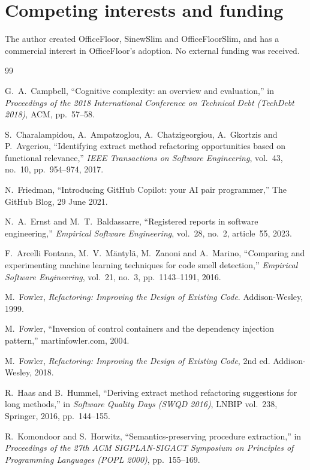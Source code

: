 \documentclass[11pt,a4paper]{article}
\begin{document}
\section*{Competing interests and funding}

The author created OfficeFloor, SinewSlim and OfficeFloorSlim, and has a
commercial interest in OfficeFloor's adoption. No external funding was
received.

\begin{thebibliography}{99}
\small

 G.~A.~Campbell,
  ``Cognitive complexity: an overview and evaluation,'' in \emph{Proceedings
  of the 2018 International Conference on Technical Debt (TechDebt 2018)},
  ACM, pp.~57--58.

 S.~Charalampidou, A.~Ampatzoglou,
  A.~Chatzigeorgiou, A.~Gkortzis and P.~Avgeriou,
  ``Identifying extract method refactoring opportunities based on functional
  relevance,'' \emph{IEEE Transactions on Software Engineering}, vol.~43,
  no.~10, pp.~954--974, 2017.

 N.~Friedman,
  ``Introducing GitHub Copilot: your AI pair programmer,''
  The GitHub Blog, 29 June 2021.

 N.~A.~Ernst and M.~T.~Baldassarre,
  ``Registered reports in software engineering,'' \emph{Empirical Software
  Engineering}, vol.~28, no.~2, article~55, 2023.

 F.~Arcelli Fontana, M.~V.~M\"antyl\"a, M.~Zanoni and
  A.~Marino, ``Comparing and experimenting machine learning techniques for
  code smell detection,'' \emph{Empirical Software Engineering}, vol.~21,
  no.~3, pp.~1143--1191, 2016.

 M.~Fowler,
  \emph{Refactoring: Improving the Design of Existing Code}. Addison-Wesley,
  1999.

 M.~Fowler,
  ``Inversion of control containers and the dependency injection pattern,''
  martinfowler.com, 2004.

 M.~Fowler,
  \emph{Refactoring: Improving the Design of Existing Code}, 2nd ed.
  Addison-Wesley, 2018.

 R.~Haas and B.~Hummel,
  ``Deriving extract method refactoring suggestions for long methods,'' in
  \emph{Software Quality Days (SWQD 2016)}, LNBIP vol.~238, Springer, 2016,
  pp.~144--155.

 R.~Komondoor and S.~Horwitz,
  ``Semantics-preserving procedure extraction,'' in \emph{Proceedings of the
  27th ACM SIGPLAN-SIGACT Symposium on Principles of Programming Languages
  (POPL 2000)}, pp.~155--169.


\end{thebibliography}
\end{document}
